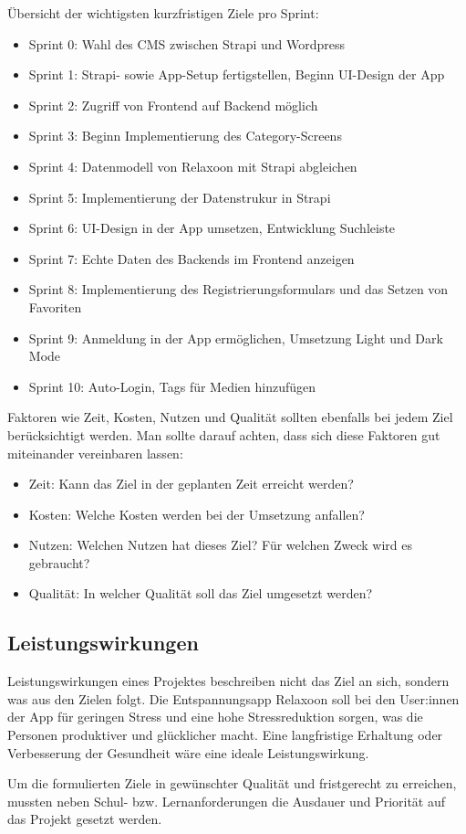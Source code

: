 Übersicht der wichtigsten kurzfristigen Ziele pro Sprint:
\begin{itemize}
      \item Sprint 0: Wahl des CMS zwischen Strapi und Wordpress
      \item Sprint 1: Strapi- sowie App-Setup fertigstellen, Beginn UI-Design der App
      \item Sprint 2: Zugriff von Frontend auf Backend möglich
      \item Sprint 3: Beginn Implementierung des Category-Screens
      \item Sprint 4: Datenmodell von Relaxoon mit Strapi abgleichen
      \item Sprint 5: Implementierung der Datenstrukur in Strapi
      \item Sprint 6: UI-Design in der App umsetzen, Entwicklung Suchleiste
      \item Sprint 7: Echte Daten des Backends im Frontend anzeigen
      \item Sprint 8: Implementierung des Registrierungsformulars und das Setzen von Favoriten 
      \item Sprint 9: Anmeldung in der App ermöglichen, Umsetzung Light und Dark Mode
      \item Sprint 10: Auto-Login, Tags für Medien hinzufügen
\end{itemize}

Faktoren wie Zeit, Kosten, Nutzen und Qualität sollten ebenfalls bei jedem Ziel berücksichtigt werden. Man
sollte darauf achten, dass sich diese Faktoren gut miteinander vereinbaren lassen:
\begin{itemize}
      \item Zeit: Kann das Ziel in der geplanten Zeit erreicht werden?
      \item Kosten: Welche Kosten werden bei der Umsetzung anfallen?
      \item Nutzen: Welchen Nutzen hat dieses Ziel? Für welchen Zweck wird es gebraucht?
      \item Qualität: In welcher Qualität soll das Ziel umgesetzt werden?
\end{itemize}

\subsection{Leistungswirkungen}

Leistungswirkungen eines Projektes beschreiben nicht das Ziel an sich, sondern was aus den Zielen folgt.
Die Entspannungsapp Relaxoon soll bei den User:innen der App für geringen Stress und eine hohe
Stressreduktion sorgen, was die Personen produktiver und glücklicher macht. Eine langfristige Erhaltung oder
Verbesserung der Gesundheit wäre eine ideale Leistungswirkung. 

Um die formulierten Ziele in gewünschter Qualität und fristgerecht zu erreichen, mussten
neben Schul- bzw. Lernanforderungen die Ausdauer und Priorität auf das Projekt
gesetzt werden.
